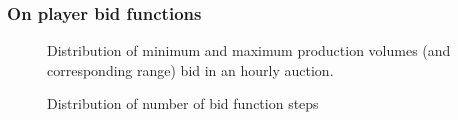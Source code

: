 \subsubsection{On player bid functions}
\begin{figure}[H]
\begin{center}
\caption{Distribution of minimum and maximum production volumes (and corresponding range) bid in an hourly auction.}
\label{g9a}
\end{center}
\end{figure}
\begin{figure}[H]
\begin{center}
\caption{Distribution of number of bid function steps}
\label{steps}
\end{center}
\end{figure}


